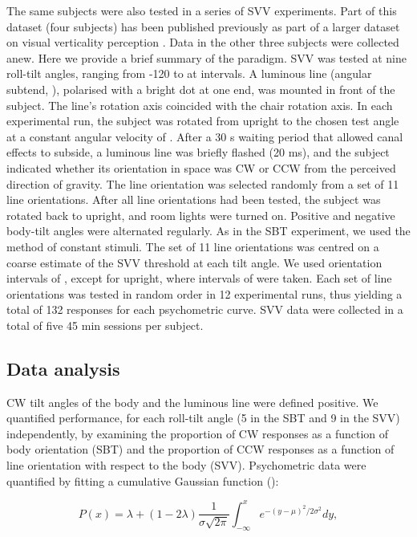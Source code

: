 The same subjects were also tested in a series of SVV experiments. Part of this dataset (four subjects) has been published previously as part of a larger dataset on visual verticality perception \cite{devrijer2009}. Data in the other three subjects were collected anew. Here we provide a brief summary of the paradigm. SVV was tested at nine roll-tilt angles, ranging from -120 to  at  intervals. A luminous line (angular subtend, ), polarised with a bright dot at one end, was mounted in front of the subject. The line's rotation axis coincided with the chair rotation axis. In each experimental run, the subject was rotated from upright to the chosen test angle at a constant angular velocity of . After a 30 \si{\second} waiting period that allowed canal effects to subside, a luminous line was briefly flashed (20 \si{\milli\second}), and the subject indicated whether its orientation in space was CW or CCW from the perceived direction of gravity. The line orientation was selected randomly from a set of 11 line orientations. After all line orientations had been tested, the subject was rotated back to upright, and room lights were turned on. Positive and negative body-tilt angles were alternated regularly. As in the SBT experiment, we used the method of constant stimuli. The set of 11 line orientations was centred on a coarse estimate of the SVV threshold at each tilt angle. We used orientation intervals of , except for upright, where intervals of  were taken. Each set of line orientations was tested in random order in 12 experimental runs, thus yielding a total of 132 responses for each psychometric curve. SVV data were collected in a total of five 45 min sessions per subject.

\subsection{Data analysis}

CW tilt angles of the body and the luminous line were defined positive. We quantified performance, for each roll-tilt angle (5 in the SBT and 9 in the SVV) independently, by examining the proportion of CW responses as a function of body orientation (SBT) and the proportion of CCW responses as a function of line orientation with respect to the body (SVV). Psychometric data were quantified by fitting a cumulative Gaussian function ():

\begin{equation}
\label{p1:eqn1}
P(x) = \lambda + (1 - 2\lambda) \frac{1}{\sigma \sqrt{2\pi}} \int_{-\infty}^{x}{e^{-(y-\mu)^2 / 2\sigma^2}}dy,
\end{equation}


